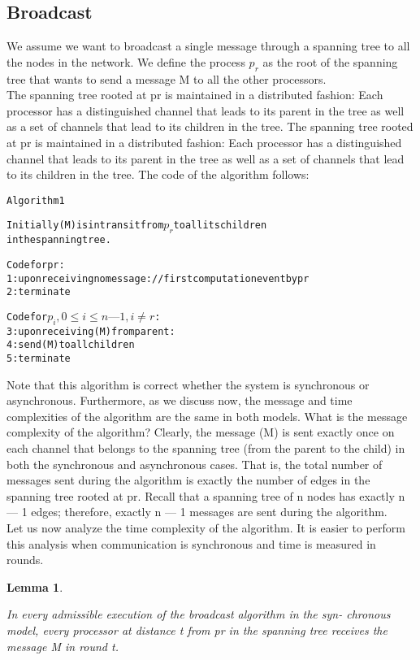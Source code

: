 \documentclass{article}
\newtheorem{lem}[thm]{Lemma}
\newenvironment{lemma}{\begin{lem}\begin{rm}}%
{\end{rm}\end{lem}}
\begin{document}
\subsection{Broadcast}
We assume we want to broadcast a single message through a spanning tree to all the nodes in the network. We define the process $p_r$ as the root of the spanning tree that wants to send a message M to all the other processors.\\
The spanning tree rooted at pr is maintained in 
a distributed fashion: Each processor has a distinguished channel that leads to its 
parent in the tree as well as a set of channels that lead to its children in the tree. 
The spanning tree rooted at pr is maintained in 
a distributed fashion: Each processor has a distinguished channel that leads to its 
parent in the tree as well as a set of channels that lead to its children in the tree. 
The code of the algorithm follows:
\begin{alltt}
Algorithm 1

Initially (M) is in transit from \(p_r\) to all its children
in the spanning tree.
 
Code for pr: 
	1: upon receiving no message: // first computation event by pr 
	2: terminate
	 
Code for \(p_i, 0 \leq i \leq n — 1, i \neq r\): 
	3: upon receiving (M) from parent: 
	4: send (M) to all children 
	5: terminate 
\end{alltt}
Note that this algorithm is correct whether the system is synchronous or asynchronous. Furthermore, as we discuss now, the message and time complexities of the 
algorithm are the same in both models. 
What is the message complexity of the algorithm? Clearly, the message (M) is 
sent exactly once on each channel that belongs to the spanning tree (from the parent to 
the child) in both the synchronous and asynchronous cases. That is, the total number 
of messages sent during the algorithm is exactly the number of edges in the spanning 
tree rooted at pr. Recall that a spanning tree of n nodes has exactly n — 1 edges; 
therefore, exactly n — 1 messages are sent during the algorithm. \\
Let us now analyze the time complexity of the algorithm. It is easier to perform 
this analysis when communication is synchronous and time is measured in rounds. \\

\begin{lemma}
In every admissible execution of the broadcast algorithm in the syn- chronous model, every processor at distance t from pr in the spanning tree receives the message M in round t. 
\end{lemma}
\end{document}
